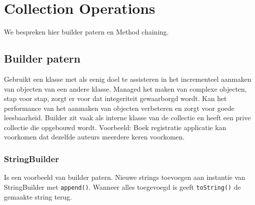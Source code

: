 \section{Collection Operations}
We bespreken hier builder patern en Method chaining.

\subsection{Builder patern}
Gebruikt een klasse met als eenig doel te assisteren in het incrementeel aanmaken van objecten van een andere klasse.
Managed het maken van complexe objecten, stap voor stap, zorgt er voor dat integeriteit gewaarborgd wordt.
Kan het performance van het aanmaken van objecten verbeteren en zorgt voor goede leesbaarheid.
Builder zit vaak als interne klasse van de collectie en heeft een prive collectie die opgebouwd wordt.
Voorbeeld: Boek registratie applicatie kan voorkomen dat dezelfde auteurs meerdere keren voorkomen.

\subsubsection{StringBuilder}
Is een voorbeeld van builder patern.
Nieuwe strings toevoegen aan instantie van StringBuilder met \texttt{append()}.
Wanneer alles toegevoegd is geeft \texttt{toString()} de gemaakte string terug.

